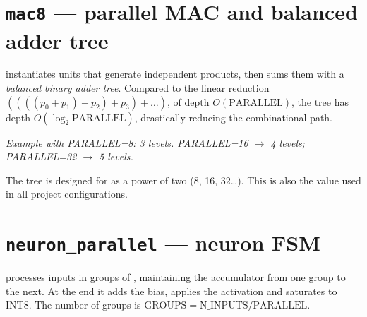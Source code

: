 \section{\texttt{mac8} --- parallel MAC and balanced adder tree}
 instantiates   units that generate
 independent products, then sums them with a \emph{balanced binary
adder tree}. Compared to the linear reduction
$((((p_0{+}p_1){+}p_2){+}p_3){+}\dots)$, of depth $O(\text{PARALLEL})$, the tree has
depth $O(\log_2 \text{PARALLEL})$, drastically reducing the combinational path.

\begin{center}
\end{center}
\begin{center}\footnotesize\itshape\color{fnGrey}
Example with PARALLEL=8: 3 levels. PARALLEL=16 $\to$ 4 levels; PARALLEL=32 $\to$ 5
levels.\end{center}

\begin{fnnote}
The tree is designed for  as a power of two (8, 16, 32\ldots). This is
also the value used in all project configurations.
\end{fnnote}

\section{\texttt{neuron\_parallel} --- neuron FSM}
 processes  inputs in groups of ,
maintaining the accumulator from one group to the next. At the end it adds the bias,
applies the activation and saturates to INT8. The number of groups is
$\text{GROUPS}=\text{N\_INPUTS}/\text{PARALLEL}$.

